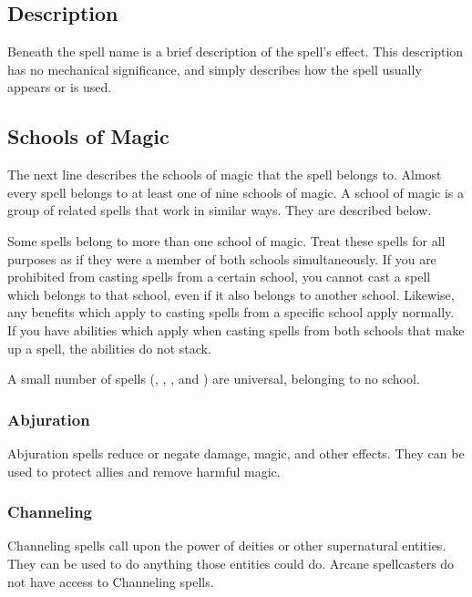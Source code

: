     \subsection{Description}
        Beneath the spell name is a brief description of the spell's effect.
        This description has no mechanical significance, and simply describes how the spell usually appears or is used.

    \subsection{Schools of Magic}\label{Schools of Magic}
        The next line describes the schools of magic that the spell belongs to.
        Almost every spell belongs to at least one of nine schools of magic.
        A school of magic is a group of related spells that work in similar ways.
        They are described below.

        Some spells belong to more than one school of magic.
        Treat these spells for all purposes as if they were a member of both schools simultaneously.
        If you are prohibited from casting spells from a certain school, you cannot cast a spell which belongs to that school, even if it also belongs to another school.
        Likewise, any benefits which apply to casting spells from a specific school apply normally.
        If you have abilities which apply when casting spells from both schools that make up a spell, the abilities do not stack.

        A small number of spells (, , , and ) are universal, belonging to no school.

        \subsubsection{Abjuration}
            Abjuration spells reduce or negate damage, magic, and other effects.
            They can be used to protect allies and remove harmful magic.

        \subsubsection{Channeling}
            Channeling spells call upon the power of deities or other supernatural entities.
            They can be used to do anything those entities could do.
            Arcane spellcasters do not have access to Channeling spells.

